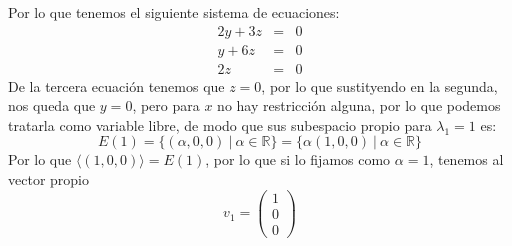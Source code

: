\begin{itemize}
\begin{itemize}
Por lo que tenemos el siguiente sistema de ecuaciones:
\begin{eqnarray*}
2y+3z&=&0\\y+6z&=&0\\2z&=&0\end{eqnarray*}
De la tercera ecuaci\'on tenemos que $z=0$, por lo que sustityendo en la segunda, nos queda que $y=0$, pero para $x$ no hay restricci\'on alguna, por lo que podemos tratarla como variable libre, de modo que sus subespacio propio para $\lambda_1=1$ es:
\[E(1)=\{(\alpha,0,0)~|~\alpha\in \mathbb{R}\}=\{\alpha(1,0,0)~|~\alpha\in \mathbb{R}\}\]
Por lo que $\langle(1,0,0)\rangle=E(1)$, por lo que si lo fijamos como $\alpha=1$, tenemos al vector propio
\[v_1=\begin{pmatrix}1\\0\\0\end{pmatrix}\]



\end{itemize}
\end{itemize}
